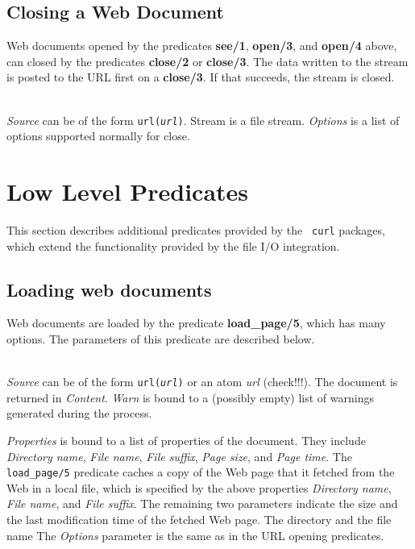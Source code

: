 \subsection{Closing a Web Document}

Web documents opened by the predicates {\bf see/1},  {\bf open/3}, and {\bf open/4} above, can closed by the predicates {\bf close/2} or {\bf close/3}. The data written to the stream is posted to the URL first on a {\bf close/3}. If that succeeds, the stream is closed.

\begin{description}

\item[close({\it +Stream, +Source})]\mbox{}
\item[close({\it +Stream, +Source, +Options})]\mbox{}
  \\

{\it Source} can be of the form {\tt url({\it {url}})}. Stream is a file stream. {\it Options} is a list of options supported normally for close.

\end{description}


\section{Low Level Predicates}

This section describes additional predicates provided by the {\tt
  curl} packages, which extend the functionality provided by the file I/O
integration.

\subsection{Loading web documents}

Web documents are loaded by the predicate {\bf load\_page/5}, which has
many options. The parameters of this predicate are described below.


\begin{description}
\item[load\_page({\it +Source, +Options, -Properties, -Content, -Warn})]\mbox{}
  \\
  {\it Source} can be of the form {\tt url({\it {url}})} or an atom
  \emph{url} (check!!!). 
  The document is returned in {\it Content}.
  {\it Warn} is bound to a (possibly empty) list of warnings generated during the process.

  {\it Properties} is bound to a list of properties of the document. They
  include {\it Directory name}, {\it File name}, {\it File suffix}, {\it
    Page size}, and {\it Page time}.
  The {\tt load\_page/5}  predicate caches a copy of the Web page that it
  fetched from the Web in a local file, which is specified by the above
  properties \emph{Directory name}, \emph{File name}, and \emph{File
    suffix}. The remaining two parameters indicate the size and the last
  modification time of the fetched Web page.
  The directory and the file name 
  The \emph{Options} parameter is the same as in the URL opening
  predicates. 

\end{description}

